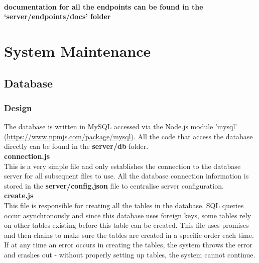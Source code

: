 \documentclass[12pt]{article}
\begin{document}
\noindent\\
\textbf{documentation for all the endpoints can be found in the ‘server/endpoints/docs’ folder}

\newpage

\section{System Maintenance}
\subsection{Database}

\subsubsection{Design}
The database is written in MySQL accessed via the Node.js module 'mysql' (\href{https://www.npmjs.com/package/mysql}{https://www.npmjs.com/package/mysql}). All the code that access the database directly can be found in the \textbf{server/db} folder.\\

\noindent
\textbf{connection.js}\\
\noindent
This is a very simple file and only establishes the connection to the database server for all subsequent files to use. All the database connection information is stored in the \textbf{server/config.json} file to centralise server configuration.\\

\noindent
\textbf{create.js}\\
\noindent
This file is responsible for creating all the tables in the database. SQL queries occur asynchronously and since this database uses foreign keys, some tables rely on other tables existing before this table can be created. This file uses promises and then chains to make sure the tables are created in a specific order each time.\\
If at any time an error occurs in creating the tables, the system throws the error and crashes out - without properly setting up tables, the system cannot continue.\\
\end{document}
